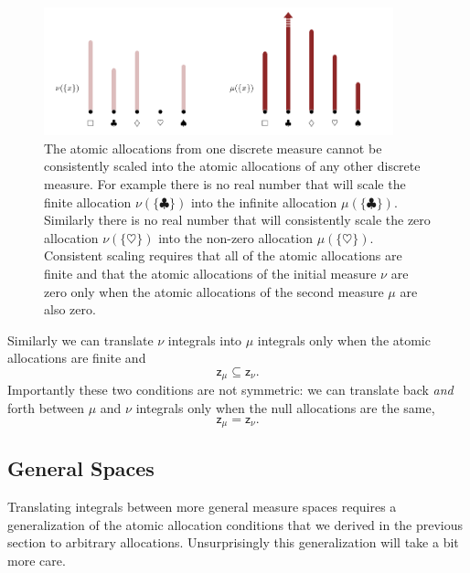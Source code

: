 \documentclass[
  letterpaper,
  DIV=11,
  numbers=noendperiod]{scrartcl}
\begin{document}
\begin{figure}

{\centering \includegraphics[width=0.9\textwidth,height=\textheight]{figures/scaling_mass_functions/scaling_mass_functions.pdf}

}

\caption{\label{fig-scaling-mass-functions}The atomic allocations from
one discrete measure cannot be consistently scaled into the atomic
allocations of any other discrete measure. For example there is no real
number that will scale the finite allocation \(\nu(\{ \clubsuit \})\)
into the infinite allocation \(\mu(\{ \clubsuit \})\). Similarly there
is no real number that will consistently scale the zero allocation
\(\nu(\{ \heartsuit \})\) into the non-zero allocation
\(\mu(\{ \heartsuit \})\). Consistent scaling requires that all of the
atomic allocations are finite and that the atomic allocations of the
initial measure \(\nu\) are zero only when the atomic allocations of the
second measure \(\mu\) are also zero.}

\end{figure}

Similarly we can translate \(\nu\) integrals into \(\mu\) integrals only
when the atomic allocations are finite and \[
\mathsf{z}_{\mu} \subseteq \mathsf{z}_{\nu}.
\] Importantly these two conditions are not symmetric: we can translate
back \emph{and} forth between \(\mu\) and \(\nu\) integrals only when
the null allocations are the same, \[
\mathsf{z}_{\mu} = \mathsf{z}_{\nu}.
\]

\hypertarget{general-spaces}{%
\subsection{General Spaces}\label{general-spaces}}

Translating integrals between more general measure spaces requires a
generalization of the atomic allocation conditions that we derived in
the previous section to arbitrary allocations. Unsurprisingly this
generalization will take a bit more care.
\end{document}

